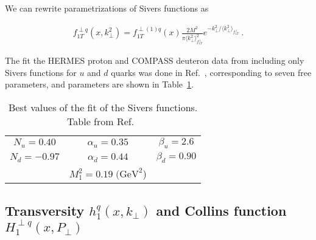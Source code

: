 \documentclass[a4paper,11pt]{article}
\newcommand{\ba}{\begin{eqnarray}}
\newcommand{\ea}{\end{eqnarray}}
\newcommand{\la}{\langle}
\newcommand{\ra}{\rangle}
\def\kperp{k_\perp}
\def\avkperp{\la \kperp^2 \ra}
\begin{document}
We can rewrite parametrizations of Sivers functions as

\ba
f_{1T}^{\perp q}(x,\kperp^2) =  f_{1T}^{\perp (1) q}(x)   \frac{2 M^2}{\pi \avkperp_{f_{1T}^\perp}^2} e^{-\kperp^2/{\avkperp_{f_{1T}^\perp}}}
\label{sivers_new} \ .
\ea

The fit the HERMES proton and COMPASS deuteron data from 
including only Sivers functions for $u$ and $d$ quarks was done in Ref.~\cite{Anselmino:2011gs},
corresponding to seven free parameters, and parameters are shown in Table~\ref{tab:a}.


\begin{table}
\centering
\begin{tabular}{ccc}
\hline
$N_u=0.40$ & $\alpha_u=0.35$ & $\beta_u=2.6$ \\
$N_d=-0.97$ & $\alpha_d=0.44$ & $\beta_d=0.90$\\
& $M_1^2=0.19\; \textrm{(GeV}^2$) &   \\
\hline
\end{tabular}
\caption{Best values of the fit of the Sivers functions. Table from Ref.~\cite{Anselmino:2011gs}}
\label{tab:a}
\end{table}



\subsection{\boldmath Transversity $h_{1}^{q}(x,k_\perp)$ and 
Collins function $H_{1}^{\perp q}(x,P_\perp)$}
\label{App:basis-h1-H1perp}
\end{document}
